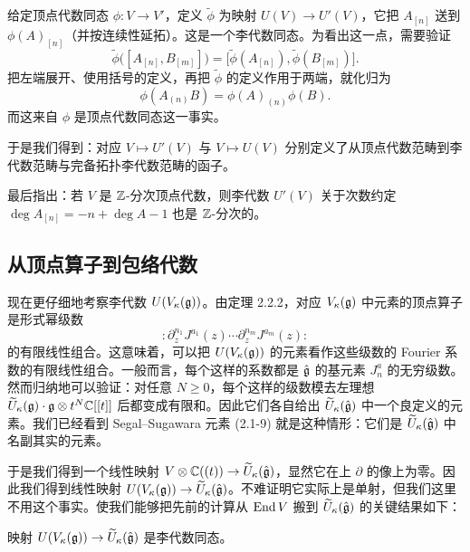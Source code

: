 给定顶点代数同态 $\phi:V\to V'$，定义 $\widetilde\phi$ 为映射 $U(V)\to U'(V)$，它把 $A_{[n]}$ 送到 $\phi(A)_{[n]}$（并按连续性延拓）。这是一个李代数同态。为看出这一点，需要验证
\[
    \widetilde\phi\bigl([A_{[n]}, B_{[m]}]\bigr)
    = \bigl[\widetilde\phi(A_{[n]}), \widetilde\phi(B_{[m]})\bigr].
\]
把左端展开、使用括号的定义，再把 $\widetilde\phi$ 的定义作用于两端，就化归为
\[
    \phi(A_{(n)}B) = \phi(A)_{(n)}\phi(B).
\]
而这来自 $\phi$ 是顶点代数同态这一事实。

于是我们得到：对应 $V\mapsto U'(V)$ 与 $V\mapsto U(V)$ 分别定义了从顶点代数范畴到李代数范畴与完备拓扑李代数范畴的函子。

最后指出：若 $V$ 是 $\mathbb{Z}$-分次顶点代数，则李代数 $U'(V)$ 关于次数约定 $\deg A_{[n]}=-n+\deg A-1$ 也是 $\mathbb{Z}$-分次的。

\subsection{从顶点算子到包络代数}

现在更仔细地考察李代数 $U(V_\kappa(\mathfrak{g}))$。由定理 2.2.2，对应 $V_\kappa(\mathfrak{g})$ 中元素的顶点算子是形式幂级数
\[
    :\partial_z^{n_1}J^{a_1}(z)\cdots\partial_z^{n_m}J^{a_m}(z):
\]
的有限线性组合。这意味着，可以把 $U(V_\kappa(\mathfrak{g}))$ 的元素看作这些级数的 Fourier 系数的有限线性组合。一般而言，每个这样的系数都是 $\hat{\mathfrak{g}}$ 的基元素 $J^a_n$ 的无穷级数。然而归纳地可以验证：对任意 $N\ge 0$，每个这样的级数模去左理想 $\widetilde U_\kappa(\mathfrak{g})\cdot\mathfrak{g}\otimes t^N\mathbb{C}[[t]]$ 后都变成有限和。因此它们各自给出 $\widetilde U_\kappa(\hat{\mathfrak{g}})$ 中一个良定义的元素。我们已经看到 Segal--Sugawara 元素 (2.1-9) 就是这种情形：它们是 $\widetilde U_\kappa(\hat{\mathfrak{g}})$ 中名副其实的元素。

于是我们得到一个线性映射 $V\otimes\mathbb{C}((t))\to\widetilde U_\kappa(\hat{\mathfrak{g}})$，显然它在上 $\partial$ 的像上为零。因此我们得到线性映射 $U(V_\kappa(\mathfrak{g}))\to\widetilde U_\kappa(\hat{\mathfrak{g}})$。不难证明它实际上是单射，但我们这里不用这个事实。使我们能够把先前的计算从 $\operatorname{End} V$ 搬到 $\widetilde U_\kappa(\hat{\mathfrak{g}})$ 的关键结果如下：

\begin{proposition}
    映射 $U(V_\kappa(\mathfrak{g}))\to\widetilde U_\kappa(\hat{\mathfrak{g}})$ 是李代数同态。
\end{proposition}


